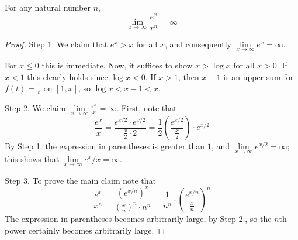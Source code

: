 \begin{subappendices}
    \begin{thm}
        For any natural number $n$, \begin{equation}
            \lim\limits_{x\rightarrow \infty}\frac{e^x}{x^n} = \infty
        \end{equation}
    \end{thm}
    \begin{proof}
        Step 1. We claim that $e^x > x$ for all $x$, and consequently $\lim\limits_{x\rightarrow \infty}e^x = \infty$.

        For $x \leq 0$ this is immediate. Now, it suffices to show $x > \log x$ for all $x > 0$. If $x < 1$ this clearly holds since $\log x < 0$. If $x > 1$, then $x-1$ is an upper sum for $f(t) = \frac{1}{t}$ on $[1,x]$, so $\log x < x-1 < x$.


        Step 2. We claim $\lim\limits_{x\rightarrow \infty}\frac{e^x}{x} = \infty$. First, note that \begin{equation*}
            \frac{e^x}{x} = \frac{e^{x/2}\cdot e^{x/2}}{\frac{x}{2}\cdot 2} = \frac{1}{2}\left(\frac{e^{x/2}}{\frac{x}{2}}\right)\cdot e^{x/2}
        \end{equation*}
        By Step 1. the expression in parentheses is greater than $1$, and $\lim\limits_{x\rightarrow \infty}e^{x/2} = \infty$; this shows that $\lim\limits_{x\rightarrow \infty}e^x/x = \infty$.


        Step 3. To prove the main claim note that \begin{equation*}
            \frac{e^x}{x^n} = \frac{(e^{x/n})^x}{\left(\frac{x}{n}\right)^n\cdot n^n} = \frac{1}{n^n}\cdot \left(\frac{e^{x/n}}{\frac{x}{n}}\right)^n
        \end{equation*}
        The expression in parentheses becomes arbitrarily large, by Step 2., so the $n$th power certainly becomes arbitrarily large.
    \end{proof}




\end{subappendices}

